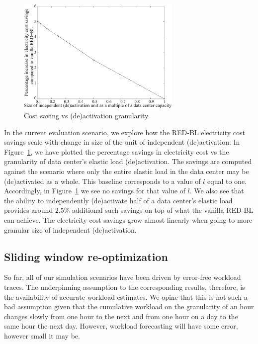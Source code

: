 \begin{figure}
    \centering
    \includegraphics[width=0.7\textwidth]{pics/s6.eps}
\caption{Cost saving vs (de)activation granularity}
\label{fig:granular-deactivation}
\end{figure}

In the current evaluation scenario, we explore how the RED-BL electricity cost savings scale with change in size of the unit of independent (de)activation. In Figure~\ref{fig:granular-deactivation}, we have plotted the percentage savings in electricity cost vs the granularity of data center's elastic load (de)activation. The savings are computed against the scenario where only the entire elastic load in the data center may be (de)activated as a whole. This baseline corresponds to a value of $l$ equal to one. Accordingly, in Figure~\ref{fig:granular-deactivation} we see no savings for that value of $l$. We also see that the ability to independently (de)activate half of a data center's elastic load provides around $2.5\%$ additional such savings on top of what the vanilla RED-BL can achieve. The electricity cost savings grow almost linearly when going to more granular size of independent (de)activation.

\subsection{Sliding window re-optimization}
So far, all of our simulation scenarios have been driven by error-free workload traces. The underpinning assumption to the corresponding results, therefore, is the availability of accurate workload estimates. We opine that this is not such a bad assumption given that the cumulative workload on the granularity of an hour changes slowly from one hour to the next and from one hour on a day to the same hour the next day. However, workload forecasting will have some error, however small it may be. 

